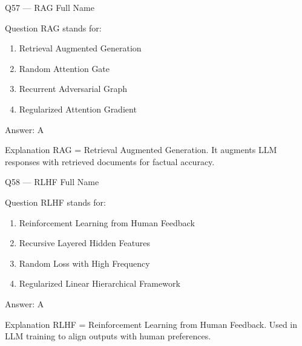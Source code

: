 \documentclass[aspectratio=169,8pt]{beamer}
\begin{document}
	\begin{frame}{Q57 --- RAG Full Name}
		\begin{block}{Question}
			RAG stands for:
			\begin{enumerate}
				\item Retrieval Augmented Generation
				\item Random Attention Gate
				\item Recurrent Adversarial Graph
				\item Regularized Attention Gradient
			\end{enumerate}
		\end{block}
		\begin{exampleblock}{Answer: A}\end{exampleblock}
		\begin{block}{Explanation}
			RAG = Retrieval Augmented Generation. It augments LLM responses with retrieved documents for factual accuracy.
		\end{block}
	\end{frame}
	
	\begin{frame}{Q58 --- RLHF Full Name}
		\begin{block}{Question}
			RLHF stands for:
			\begin{enumerate}
				\item Reinforcement Learning from Human Feedback
				\item Recursive Layered Hidden Features
				\item Random Loss with High Frequency
				\item Regularized Linear Hierarchical Framework
			\end{enumerate}
		\end{block}
		\begin{exampleblock}{Answer: A}\end{exampleblock}
		\begin{block}{Explanation}
			RLHF = Reinforcement Learning from Human Feedback. Used in LLM training to align outputs with human preferences.
		\end{block}
	\end{frame}
	
\end{document}
